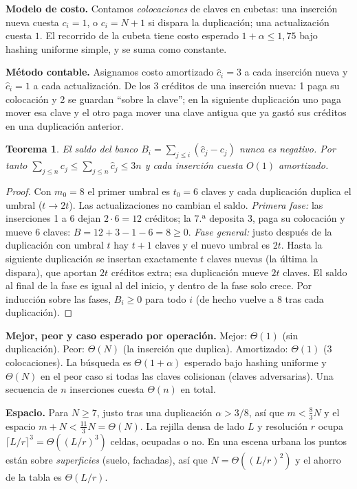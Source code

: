 \documentclass[11pt,letterpaper]{article}
\theoremstyle{plain}
\newtheorem{teorema}{Teorema}
\theoremstyle{definition}
\newcommand{\Th}{\Theta}
\begin{document}
\textbf{Modelo de costo.} Contamos \emph{colocaciones} de claves en cubetas: una inserción nueva cuesta
$c_i=1$, o $c_i=N+1$ si dispara la duplicación; una actualización cuesta $1$. El recorrido de la
cubeta tiene costo esperado $1+\alpha\le 1{,}75$ bajo hashing uniforme simple, y se suma como constante.

\textbf{Método contable.} Asignamos costo amortizado $\hat c_i=3$ a cada inserción nueva y $\hat c_i=1$
a cada actualización. De los 3 créditos de una inserción nueva: 1 paga su colocación y 2 se guardan
``sobre la clave''; en la siguiente duplicación uno paga mover esa clave y el otro paga mover una
clave antigua que ya gastó sus créditos en una duplicación anterior.

\begin{teorema}
El saldo del banco $B_i=\sum_{j\le i}(\hat c_j-c_j)$ nunca es negativo. Por tanto
$\sum_{j\le n}c_j\le \sum_{j\le n}\hat c_j\le 3n$ y cada inserción cuesta $O(1)$ amortizado.
\end{teorema}
\begin{proof}
Con $m_0=8$ el primer umbral es $t_0=6$ claves y cada duplicación duplica el umbral ($t\to2t$). Las
actualizaciones no cambian el saldo. \emph{Primera fase:} las inserciones 1 a 6 dejan $2\cdot6=12$
créditos; la 7.ª deposita 3, paga su colocación y mueve 6 claves: $B=12+3-1-6=8\ge0$.
\emph{Fase general:} justo después de la duplicación con umbral $t$ hay $t+1$ claves y el nuevo umbral
es $2t$. Hasta la siguiente duplicación se insertan exactamente $t$ claves nuevas (la última la
dispara), que aportan $2t$ créditos extra; esa duplicación mueve $2t$ claves. El saldo al final de la
fase es igual al del inicio, y dentro de la fase solo crece. Por inducción sobre las fases,
$B_i\ge0$ para todo $i$ (de hecho vuelve a $8$ tras cada duplicación).
\end{proof}

\textbf{Mejor, peor y caso esperado por operación.} Mejor: $\Th(1)$ (sin duplicación). Peor: $\Th(N)$
(la inserción que duplica). Amortizado: $\Th(1)$ (3 colocaciones). La búsqueda es $\Th(1+\alpha)$
esperado bajo hashing uniforme y $\Th(N)$ en el peor caso si todas las claves colisionan (claves
adversarias). Una secuencia de $n$ inserciones cuesta $\Th(n)$ en total.

\textbf{Espacio.} Para $N\ge7$, justo tras una duplicación $\alpha>3/8$, así que $m<\tfrac83N$ y el
espacio $m+N<\tfrac{11}{3}N=\Th(N)$. La rejilla densa de lado $L$ y resolución $r$ ocupa
$\lceil L/r\rceil^3=\Th((L/r)^3)$ celdas, ocupadas o no. En una escena urbana los puntos están sobre
\emph{superficies} (suelo, fachadas), así que $N=\Th((L/r)^2)$ y el ahorro de la tabla es $\Th(L/r)$.
\end{document}
